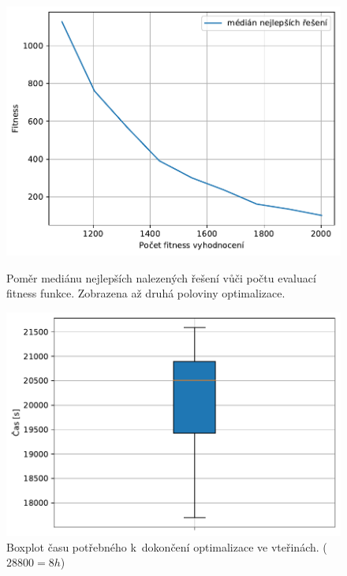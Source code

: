 \begin{figure}[H]
\begin{minipage}[t]{0.475\linewidth}
	\includegraphics[width=\textwidth]{obrazky-figures/statistics/HIFU/blob/20/GA/bestsToFitness_1.pdf}
	\caption{Poměr mediánu nejlepších nalezených řešení vůči počtu evaluací fitness funkce. Zobrazena až druhá poloviny optimalizace.}
	\label{fg:hifu:blob:ga:fitPerf}
\end{minipage}
\hfill
\begin{minipage}[t]{0.475\linewidth}
\includegraphics[width=\linewidth]{obrazky-figures/statistics/HIFU/blob/20/GA/timeBoxplot_WithOutliers.pdf}
\caption{Boxplot času potřebného k~dokončení optimalizace ve vteřinách. ($28800 = 8h$)}
\label{fg:hifu:blob:ga:time}
\end{minipage}
\end{figure}

